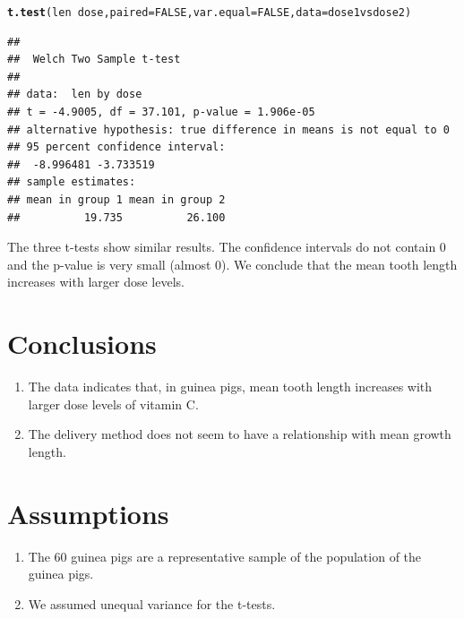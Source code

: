 \documentclass{article}\usepackage[]{graphicx}\usepackage[]{color}
\makeatletter
\newcommand{\hlnum}[1]{\textcolor[rgb]{0.686,0.059,0.569}{#1}}%
\newcommand{\hlopt}[1]{\textcolor[rgb]{0,0,0}{#1}}%
\newcommand{\hlstd}[1]{\textcolor[rgb]{0.345,0.345,0.345}{#1}}%
\newcommand{\hlkwc}[1]{\textcolor[rgb]{0.333,0.667,0.333}{#1}}%
\newcommand{\hlkwd}[1]{\textcolor[rgb]{0.737,0.353,0.396}{\textbf{#1}}}%
\newenvironment{kframe}{%
 \def\at@end@of@kframe{}%
 \ifinner\ifhmode%
  \def\at@end@of@kframe{\end{minipage}}%
  \begin{minipage}{\columnwidth}%
 \fi\fi%
 \def\FrameCommand##1{\hskip\@totalleftmargin \hskip-\fboxsep
 \colorbox{shadecolor}{##1}\hskip-\fboxsep
     \hskip-\linewidth \hskip-\@totalleftmargin \hskip\columnwidth}%
 \MakeFramed {\advance\hsize-\width
   \@totalleftmargin\z@ \linewidth\hsize
   \@setminipage}}%
 {\par\unskip\endMakeFramed%
 \at@end@of@kframe}
\newenvironment{knitrout}{}{} %
\makeatother
\begin{document}
\begin{knitrout}
\color{fgcolor}\begin{kframe}
\begin{alltt}
\hlkwd{t.test}\hlstd{(len} \hlopt{~} \hlstd{dose,} \hlkwc{paired} \hlstd{=} \hlnum{FALSE}\hlstd{,} \hlkwc{var.equal} \hlstd{=} \hlnum{FALSE}\hlstd{,} \hlkwc{data} \hlstd{= dose1vsdose2)}
\end{alltt}
\begin{verbatim}
## 
## 	Welch Two Sample t-test
## 
## data:  len by dose
## t = -4.9005, df = 37.101, p-value = 1.906e-05
## alternative hypothesis: true difference in means is not equal to 0
## 95 percent confidence interval:
##  -8.996481 -3.733519
## sample estimates:
## mean in group 1 mean in group 2 
##          19.735          26.100
\end{verbatim}
\end{kframe}
\end{knitrout}


The three t-tests show similar results. The confidence intervals do not contain 0 and the p-value is very small (almost 0). We conclude that the mean tooth length increases with larger dose levels. 

\section{Conclusions}
\begin{enumerate}
\item The data indicates that, in guinea pigs,  mean tooth length increases with larger dose levels of vitamin C.
\item The delivery method does not seem to have a relationship with mean growth length.
\end{enumerate}

\section{Assumptions}
\begin{enumerate}
\item The 60 guinea pigs are a representative sample of the population of the guinea pigs.
\item We assumed unequal variance for the t-tests.
\end{enumerate}


  
\end{document}
